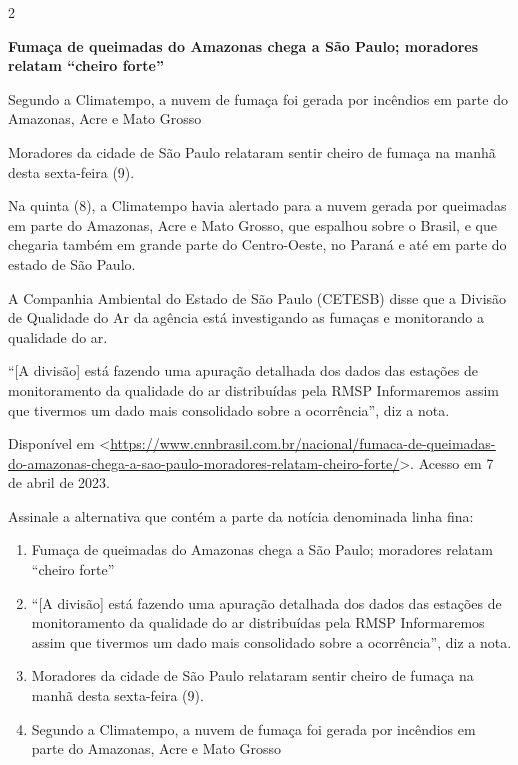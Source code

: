{{\begin{escolha}
{\begin{itemize}
\begin{itemize}
\num{2}

\textbf{Fumaça de queimadas do Amazonas chega a São Paulo; moradores
relatam ``cheiro forte''}

Segundo a Climatempo, a nuvem de fumaça foi gerada por incêndios em
parte do Amazonas, Acre e Mato Grosso

Moradores da cidade de São Paulo relataram sentir cheiro de fumaça na
manhã desta sexta-feira (9).

Na quinta (8), a Climatempo havia alertado para a nuvem gerada por
queimadas em parte do Amazonas, Acre e Mato Grosso, que espalhou sobre o
Brasil, e que chegaria também em grande parte do Centro-Oeste, no Paraná
e até em parte do estado de São Paulo.

A Companhia Ambiental do Estado de São Paulo (CETESB) disse que a
Divisão de Qualidade do Ar da agência está investigando as fumaças e
monitorando a qualidade do ar.

``{[}A divisão{]} está fazendo uma apuração detalhada dos dados das
estações de monitoramento da qualidade do ar distribuídas pela RMSP
Informaremos assim que tivermos um dado mais consolidado sobre a
ocorrência'', diz a nota.

Disponível em
\textless{}\href{https://www.cnnbrasil.com.br/nacional/fumaca-de-queimadas-do-amazonas-chega-a-sao-paulo-moradores-relatam-cheiro-forte/}{\uline{https://www.cnnbrasil.com.br/nacional/fumaca-de-queimadas-do-amazonas-chega-a-sao-paulo-moradores-relatam-cheiro-forte/}}\textgreater.
Acesso em 7 de abril de 2023.

Assinale a alternativa que contém a parte da notícia denominada linha
fina:

\begin{enumerate}
\def\labelenumi{\alph{enumi})}
\item
  Fumaça de queimadas do Amazonas chega a São Paulo; moradores relatam
  ``cheiro forte''
\item
  ``{[}A divisão{]} está fazendo uma apuração detalhada dos dados das
  estações de monitoramento da qualidade do ar distribuídas pela RMSP
  Informaremos assim que tivermos um dado mais consolidado sobre a
  ocorrência'', diz a nota.
\item
  Moradores da cidade de São Paulo relataram sentir cheiro de fumaça na
  manhã desta sexta-feira (9).
\item
  Segundo a Climatempo, a nuvem de fumaça foi gerada por incêndios em
  parte do Amazonas, Acre e Mato Grosso
\end{enumerate}


\end{itemize}
\end{itemize}}
\end{escolha}}}
